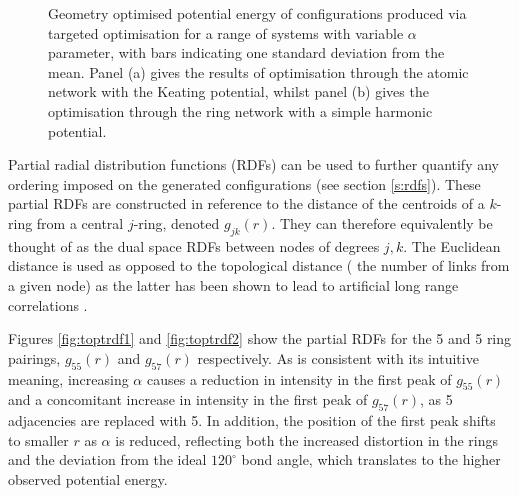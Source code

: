 \begin{figure}[bt]
     \caption{Geometry optimised potential energy of configurations produced via targeted optimisation for a range of systems with variable $\alpha$ parameter, with bars indicating one standard deviation from the mean. Panel (a) gives the results of optimisation through the atomic network with the Keating potential, whilst panel (b) gives the optimisation through the ring network with a simple harmonic potential.}
     \label{fig:toptenergy}
\end{figure}

Partial radial distribution functions (RDFs) can be used to further quantify any ordering imposed on the generated configurations (see section \ref{s:rdfs}).
These partial RDFs are constructed in reference to the distance of the centroids of a $k$\--ring from a central $j$\--ring, denoted $g_{jk}\left(r\right)$.
They can therefore equivalently be thought of as the dual space RDFs between nodes of degrees $j,k$.
The Euclidean distance is used as opposed to the topological distance (\ie{} the number of links from a given node) as the latter has been shown to lead to artificial long range correlations \cite{Sadjadi2016}. 

Figures \ref{fig:toptrdf1} and \ref{fig:toptrdf2} show the partial RDFs for the 5 and 5 ring pairings, $g_{55}\left(r\right)$ and $g_{57}\left(r\right)$ respectively.
As is consistent with its intuitive meaning, increasing $\alpha$ causes a reduction in intensity in the first peak of $g_{55}\left(r\right)$ and a concomitant increase in intensity in the first peak of $g_{57}\left(r\right)$, as 5 adjacencies are replaced with 5. 
In addition, the position of the first peak shifts to smaller $r$ as $\alpha$ is reduced, reflecting both the increased distortion in the rings and the deviation from the ideal $120^\circ$ bond angle, which translates to the higher observed potential energy.

